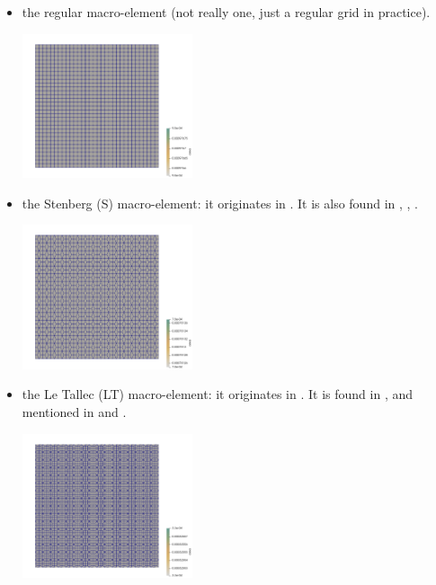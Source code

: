 \begin{itemize}
\item the regular macro-element (not really one, just a regular grid in practice).

\begin{center}
\includegraphics[width=5cm]{python_codes/fieldstone_78/images/16x16/area0.png}
\end{center}

\item the Stenberg (S) macro-element: it originates in \cite{sten84}.
It is also found in \cite{chba93}, \cite{brfo}, \cite{qizh07}.

\begin{center}
\includegraphics[width=5cm]{python_codes/fieldstone_78/images/16x16/area1.png}
\end{center}

\item the Le Tallec (LT) macro-element: it originates in \cite{leta81}. 
It is found in \cite{leru86}, \cite{qizh07}  and mentioned in \cite{brfo} and \cite{rovira1992}.
\begin{center}
\includegraphics[width=5cm]{python_codes/fieldstone_78/images/16x16/area2.png}
\end{center}


\end{itemize}
